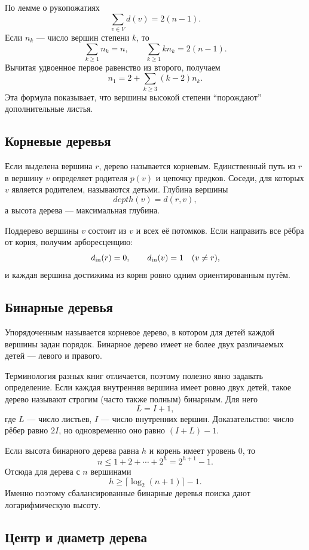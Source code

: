 По лемме о рукопожатиях
\[
    \sum_{v\in V}d(v)=2(n-1).
\]
Если $n_k$ --- число вершин степени $k$, то
\[
    \sum_{k\ge1}n_k=n,
    \qquad
    \sum_{k\ge1}k n_k=2(n-1).
\]
Вычитая удвоенное первое равенство из второго, получаем
\[
    n_1=2+\sum_{k\ge3}(k-2)n_k.
\]
Эта формула показывает, что вершины высокой степени ``порождают'' дополнительные
листья.

\subsection{Корневые деревья}

Если выделена вершина $r$, дерево называется корневым. Единственный путь из $r$
в вершину $v$ определяет родителя $p(v)$ и цепочку предков. Соседи, для которых
$v$ является родителем, называются детьми. Глубина вершины
\[
    depth(v)=d(r,v),
\]
а высота дерева --- максимальная глубина.

Поддерево вершины $v$ состоит из $v$ и всех её потомков. Если направить все рёбра
от корня, получим арборесценцию:
\[
 d_{\rm in}(r)=0,
 \qquad
 d_{\rm in}(v)=1\quad(v\ne r),
\]
и каждая вершина достижима из корня ровно одним ориентированным путём.

\subsection{Бинарные деревья}

Упорядоченным называется корневое дерево, в котором для детей каждой вершины задан
порядок. Бинарное дерево имеет не более двух различаемых детей --- левого и
правого.

Терминология разных книг отличается, поэтому полезно явно задавать определение.
Если каждая внутренняя вершина имеет ровно двух детей, такое дерево называют
строгим (часто также полным) бинарным. Для него
\[
    L=I+1,
\]
где $L$ --- число листьев, $I$ --- число внутренних вершин. Доказательство:
число рёбер равно $2I$, но одновременно оно равно $(I+L)-1$.

Если высота бинарного дерева равна $h$ и корень имеет уровень $0$, то
\[
    n\le 1+2+\cdots+2^h=2^{h+1}-1.
\]
Отсюда для дерева с $n$ вершинами
\[
    h\ge \lceil \log_2(n+1)\rceil-1.
\]
Именно поэтому сбалансированные бинарные деревья поиска дают логарифмическую
высоту.

\subsection{Центр и диаметр дерева}

